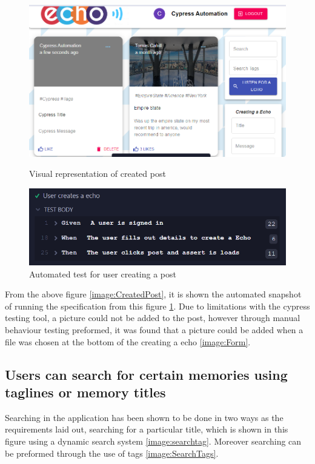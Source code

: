 \begin{figure}[ht]
\begin{minipage}[b]{0.4\linewidth}
    \centering
    \includegraphics[width=\linewidth]{images/CreatedPost}
    \caption{Visual representation of created post}
    \label{image:CreatedPost}
\end{minipage}
    \hspace{0.5cm}
    \begin{minipage}[b]{0.4\linewidth}
    \centering
   \includegraphics[width=\linewidth]{images/CreatedPostSpec}
    \caption{Automated test for user creating a post}
    \label{image:CreatedPostSpec}
\end{minipage}
\end{figure}

From the above figure \ref{image:CreatedPost}, it is shown the automated snapshot of running the specification from this figure \ref{image:CreatedPostSpec}. Due to limitations with the cypress testing tool, a picture could not be added to the post, however through manual behaviour testing preformed, it was found that a picture could be added when a file was chosen at the bottom of the creating a echo \ref{image:Form}.

\subsection{Users can search for certain memories using taglines or memory titles}
Searching in the application has been shown to be done in two ways as the requirements laid out, searching for a particular title, which is shown in this figure using a dynamic search system \ref{image:searchtag}. Moreover searching can be preformed through the use of tags \ref{image:SearchTags}.

